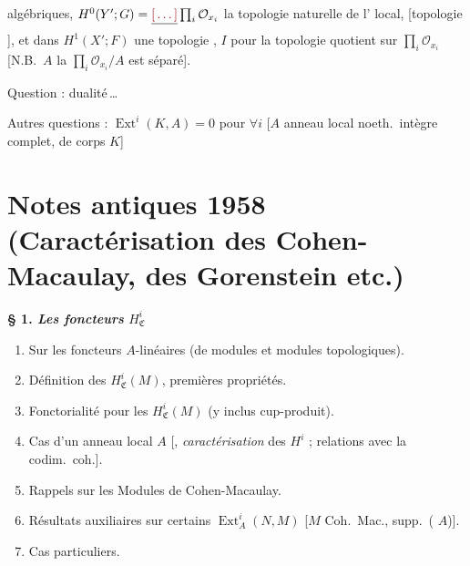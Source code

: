 \documentclass[11pt,a4paper]{article}
\begin{document}
algébriques, \ill{}   $H^0(Y'; G) =
\struck{\ill{}} \prod_i \mathcal{O}_{x_i}$ la topologie  naturelle de l'
local, [topologie  \ill{}
], et dans $H^1(X'; F)$ une
topologie ,   \ill{}
 \ill{}  $I$ pour la topologie
quotient sur $\prod_i \mathcal{O}_{x_i}$ [N.B.\ $A$
\ill{} \ill{} \ill{} \ill{} \ill{} \ill{}  la 
$\prod_i \mathcal{O}_{x_i}/A$ est séparé].

Question : dualité\,…

Autres questions : $\operatorname{Ext}^i(K, A) = 0$
pour $\forall i$ [$A$ anneau local noeth.\ intègre
complet, de corps $K$]

\section{Notes antiques 1958 (Caractérisation des Cohen-Macaulay, des Gorenstein etc.)}


\textbf{§ 1. \emph{Les foncteurs} $H^i_{\mathfrak{C}}$}

\begin{enumerate}
  \item Sur les foncteurs $A$-linéaires (de modules et modules
  topologiques).
  \item Définition des $H^i_{\mathfrak{C}}(M)$, premières propriétés.
  \item Fonctorialité pour les $H^i_{\mathfrak{C}}(M)$ (y inclus
  cup-produit).
  \item Cas d'un anneau local $A$ [,
  \emph{caractérisation} des $H^i$ ; relations avec la codim.\ coh.].
  \item Rappels sur les Modules de Cohen-Macaulay.
  \item Résultats auxiliaires sur certains $\operatorname{Ext}^i_A(N, M)$
  [$M$ Coh.\ Mac.,  supp.\ ( $A$)].
  \item Cas particuliers.
\end{enumerate}
\end{document}
